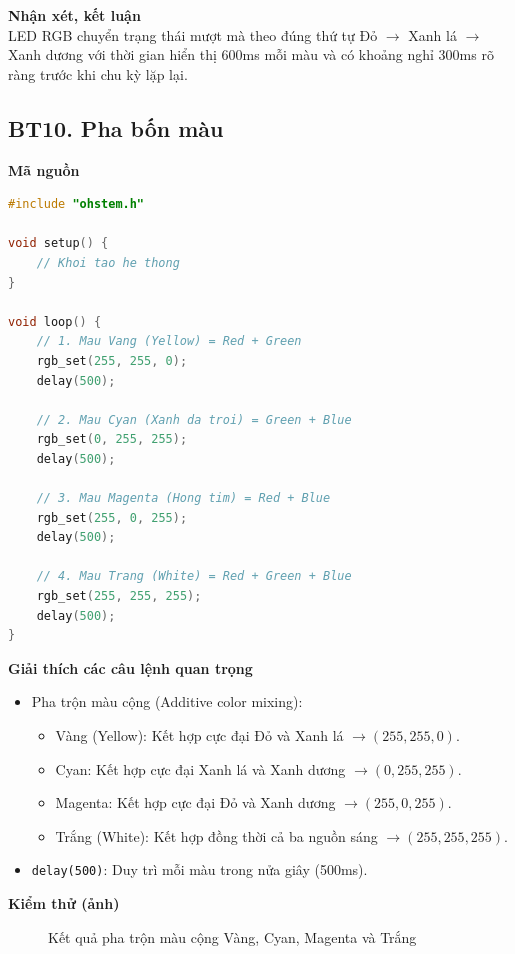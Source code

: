 \noindent\textbf{Nhận xét, kết luận}\\
LED RGB chuyển trạng thái mượt mà theo đúng thứ tự Đỏ $\to$ Xanh lá $\to$ Xanh dương với thời gian hiển thị 600ms mỗi màu và có khoảng nghỉ 300ms rõ ràng trước khi chu kỳ lặp lại.


\subsection*{BT10. Pha bốn màu}

\noindent\textbf{Mã nguồn}\\
\begin{lstlisting}[language=C]
#include "ohstem.h"

void setup() {
    // Khoi tao he thong
}

void loop() {
    // 1. Mau Vang (Yellow) = Red + Green
    rgb_set(255, 255, 0);
    delay(500);

    // 2. Mau Cyan (Xanh da troi) = Green + Blue
    rgb_set(0, 255, 255);
    delay(500);

    // 3. Mau Magenta (Hong tim) = Red + Blue
    rgb_set(255, 0, 255);
    delay(500);

    // 4. Mau Trang (White) = Red + Green + Blue
    rgb_set(255, 255, 255);
    delay(500);
}
\end{lstlisting}

\noindent\textbf{Giải thích các câu lệnh quan trọng}\\
\begin{itemize}
    \item Pha trộn màu cộng (Additive color mixing):
    \begin{itemize}
        \item Vàng (Yellow): Kết hợp cực đại Đỏ và Xanh lá $\to (255, 255, 0)$.
        \item Cyan: Kết hợp cực đại Xanh lá và Xanh dương $\to (0, 255, 255)$.
        \item Magenta: Kết hợp cực đại Đỏ và Xanh dương $\to (255, 0, 255)$.
        \item Trắng (White): Kết hợp đồng thời cả ba nguồn sáng $\to (255, 255, 255)$.
    \end{itemize}
    \item \texttt{delay(500)}: Duy trì mỗi màu trong nửa giây (500ms).
\end{itemize}

\noindent\textbf{Kiểm thử (ảnh)}\\
\begin{figure}[H]
    \centering
    \caption{Kết quả pha trộn màu cộng Vàng, Cyan, Magenta và Trắng}
    \label{fig:bt10}
\end{figure}

